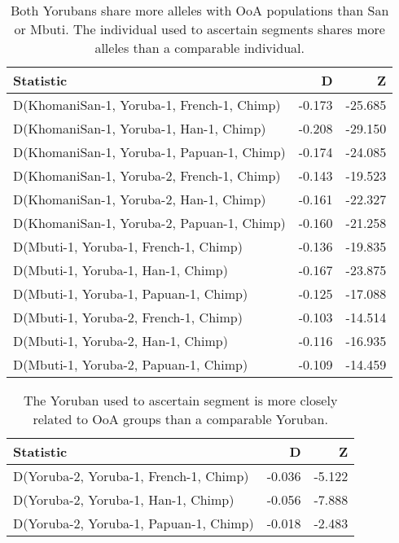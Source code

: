 \begin{table}[ht]
\centering
\begin{tabular}{lrr}
  \hline
Statistic & D & Z \\ 
  \hline
D(KhomaniSan-1, Yoruba-1, French-1, Chimp) & -0.173 & -25.685 \\ 
  D(KhomaniSan-1, Yoruba-1, Han-1, Chimp) & -0.208 & -29.150 \\ 
  D(KhomaniSan-1, Yoruba-1, Papuan-1, Chimp) & -0.174 & -24.085 \\ 
  D(KhomaniSan-1, Yoruba-2, French-1, Chimp) & -0.143 & -19.523 \\ 
  D(KhomaniSan-1, Yoruba-2, Han-1, Chimp) & -0.161 & -22.327 \\ 
  D(KhomaniSan-1, Yoruba-2, Papuan-1, Chimp) & -0.160 & -21.258 \\ 
  D(Mbuti-1, Yoruba-1, French-1, Chimp) & -0.136 & -19.835 \\ 
  D(Mbuti-1, Yoruba-1, Han-1, Chimp) & -0.167 & -23.875 \\ 
  D(Mbuti-1, Yoruba-1, Papuan-1, Chimp) & -0.125 & -17.088 \\ 
  D(Mbuti-1, Yoruba-2, French-1, Chimp) & -0.103 & -14.514 \\ 
  D(Mbuti-1, Yoruba-2, Han-1, Chimp) & -0.116 & -16.935 \\ 
  D(Mbuti-1, Yoruba-2, Papuan-1, Chimp) & -0.109 & -14.459 \\ 
   \hline
\end{tabular}
\caption{Both Yorubans share more alleles with OoA populations than San or Mbuti. The individual used to ascertain segments shares more alleles than a comparable individual.} 
\label{dstats:a2}
\end{table}
\begin{table}[ht]
\centering
\begin{tabular}{lrr}
  \hline
Statistic & D & Z \\ 
  \hline
D(Yoruba-2, Yoruba-1, French-1, Chimp) & -0.036 & -5.122 \\ 
  D(Yoruba-2, Yoruba-1, Han-1, Chimp) & -0.056 & -7.888 \\ 
  D(Yoruba-2, Yoruba-1, Papuan-1, Chimp) & -0.018 & -2.483 \\ 
   \hline
\end{tabular}
\caption{The Yoruban used to ascertain segment is more closely related to OoA groups than a comparable Yoruban.} 
\label{dstats:a3}
\end{table}
